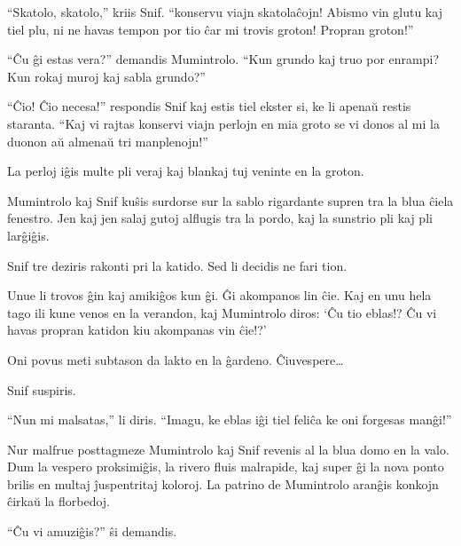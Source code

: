 ``Skatolo, skatolo,'' kriis Snif. ``konservu viajn skatolaĉojn! Abismo vin glutu kaj tiel plu, ni ne havas tempon por tio ĉar mi trovis groton! Propran groton!''

``Ĉu ĝi estas vera?'' demandis Mumintrolo. ``Kun grundo kaj truo por enrampi? Kun rokaj muroj kaj sabla grundo?''

``Ĉio! Ĉio necesa!'' respondis Snif kaj estis tiel ekster si, ke li apenaŭ restis staranta. ``Kaj vi rajtas konservi viajn perlojn en mia groto se vi donos al mi la duonon aŭ almenaŭ tri manplenojn!''

\sectionbreak

La perloj iĝis multe pli veraj kaj blankaj tuj veninte en la groton.

Mumintrolo kaj Snif kuŝis surdorse sur la sablo rigardante supren tra la blua ĉiela fenestro. Jen kaj jen salaj gutoj alflugis tra la pordo, kaj la sunstrio pli kaj pli larĝiĝis.

Snif tre deziris rakonti pri la katido. Sed li decidis ne fari tion.

Unue li trovos ĝin kaj amikiĝos kun ĝi. Ĝi akompanos lin ĉie. Kaj en unu hela tago ili kune venos en la verandon, kaj Mumintrolo diros: `Ĉu tio eblas!? Ĉu vi havas propran katidon kiu akompanas vin ĉie!?'

Oni povus meti subtason da lakto en la ĝardeno. Ĉiuvespere{\ldots}

Snif suspiris.

``Nun mi malsatas,'' li diris. ``Imagu, ke eblas iĝi tiel feliĉa ke oni forgesas manĝi!''

\sectionbreak

Nur malfrue posttagmeze Mumintrolo kaj Snif revenis al la blua domo en la valo. Dum la vespero proksimiĝis, la rivero fluis malrapide, kaj super ĝi la nova ponto brilis en multaj ĵuspentritaj koloroj. La patrino de Mumintrolo aranĝis konkojn ĉirkaŭ la florbedoj.

``Ĉu vi amuziĝis?'' ŝi demandis.

